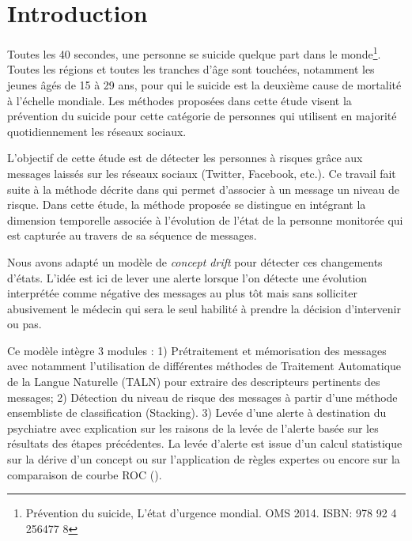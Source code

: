 \section{Introduction}

Toutes les 40 secondes, une personne se suicide quelque part dans le monde\footnote{Prévention du suicide, L'état d'urgence mondial. OMS 2014. ISBN: 978 92 4 256477 8}. Toutes les régions et toutes les  tranches d’âge sont touchées, notamment  les jeunes âgés de 15 à 29 ans, pour qui le suicide est la deuxième cause de mortalité à l’échelle mondiale. Les méthodes proposées dans cette étude visent la prévention du suicide pour cette catégorie de personnes qui utilisent en majorité quotidiennement les réseaux sociaux. 
 
L'objectif de cette étude est de détecter les personnes à risques grâce aux messages laissés sur les réseaux sociaux (Twitter, Facebook, etc.).  Ce travail fait suite à la méthode décrite dans \cite{Abboute2014} qui permet d'associer à un message un niveau de risque. Dans cette étude, la méthode proposée se distingue en intégrant la dimension temporelle associée à l'évolution de l'état de la personne monitorée qui est capturée au travers de sa séquence de messages.

Nous avons adapté un modèle de \emph{concept drift} \cite{Gama2014} pour détecter ces changements d'états. L'idée est ici de  lever une alerte lorsque l'on détecte une évolution interprétée comme négative des messages au plus tôt mais sans solliciter abusivement le médecin qui sera le seul habilité à prendre la décision d'intervenir ou pas. 

Ce modèle intègre 3 modules : 
1) Prétraitement et mémorisation des messages avec notamment l'utilisation de différentes méthodes de Traitement Automatique de la Langue Naturelle (TALN) pour extraire des descripteurs pertinents des messages; 
2) Détection du niveau de risque des messages à partir d'une méthode ensembliste de classification (Stacking). 
3) Levée d'une alerte  à destination du psychiatre avec explication sur les raisons de la levée de l'alerte basée sur les résultats des étapes précédentes. La levée d'alerte est issue d'un calcul statistique sur la dérive d'un concept ou sur l'application de règles expertes	ou encore sur la comparaison de courbe ROC (\cite{hanley1982meaning}).

